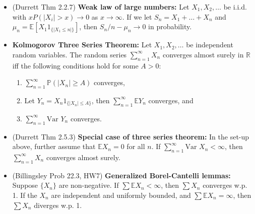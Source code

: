 \documentclass[twoside]{article}
\newcommand{\dis}{\displaystyle}
\newcommand\bbE{\mathbb{E}}
\newcommand\bbP{\mathbb{P}}
\newcommand\bbR{\mathbb{R}}
\newcommand\goesto{\rightarrow}
\newcommand\var{\text{Var }}
\begin{document}
\begin{itemize}
\item (Durrett Thm 2.2.7) \textbf{Weak law of large numbers:} Let $X_1, X_2, \dots$ be i.i.d. with $x P (|X_i| > x) \goesto 0$ as $x \goesto \infty$. If we let $S_n = X_1 + \dots + X_n$ and $\mu_n = \bbE \left[ X_1 1_{\{ |X_1 \leq n|\}} \right]$, then $S_n/n - \mu_n \goesto 0$ in probability.

\item \textbf{Kolmogorov Three Series Theorem:} Let $X_1, X_2, \dots$ be independent random variables. The random series $\dis\sum_{n=1}^\infty X_n$ converges almost surely in $\bbR$ iff the following conditions hold for some $A > 0$:
\begin{enumerate}
\item $\dis\sum_{n=1}^\infty \bbP(|X_n| \geq A)$ converges,
\item Let $Y_n = X_n 1_{\{|X_n| \leq A \}}$, then $\dis\sum_{n=1}^\infty \bbE Y_n$ converges, and
\item $\dis\sum_{n=1}^\infty \var Y_n$ converges.
\end{enumerate}

\item (Durrett Thm 2.5.3) \textbf{Special case of three series theorem:} In the set-up above, further assume that $\bbE X_n = 0$ for all $n$. If $\dis\sum_{n=1}^\infty \var X_n < \infty$, then $\dis\sum_{n=1}^\infty X_n$ converges almost surely.

\item (Billingsley Prob 22.3, HW7) \textbf{Generalized Borel-Cantelli lemmas:} Suppose $\{X_n\}$ are non-negative. If $\sum \bbE X_n < \infty$, then $\sum X_n$ converges w.p. 1. If the $X_n$ are independent and uniformly bounded, and $\sum \bbE X_n = \infty$, then $\sum X_n$ diverges w.p. 1.

\end{itemize}

\end{document}
